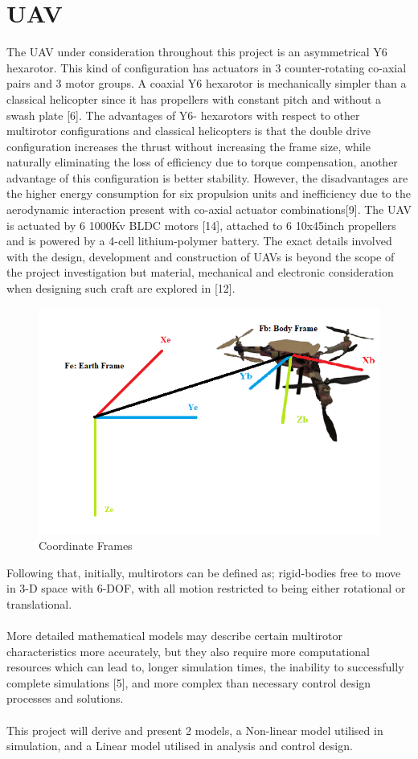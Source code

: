 \documentclass[12pt,a4paper,twoside]{report}
\begin{document}
		\section{UAV}
		
			The UAV under consideration throughout this project is an asymmetrical Y6 hexarotor. This kind of configuration has actuators in 3 counter-rotating co-axial pairs and 3 motor groups. A coaxial Y6 hexarotor is mechanically simpler than a classical helicopter since it has propellers with constant pitch and without a swash plate [6]. The advantages of Y6- hexarotors with respect to other multirotor configurations and classical helicopters is that the double drive configuration increases the thrust without increasing the frame size, while naturally eliminating the loss of efficiency due to torque compensation, another advantage of this configuration is better stability. However, the disadvantages are the higher energy consumption for six propulsion units and inefficiency due to the aerodynamic interaction present with co-axial actuator combinations[9]. The UAV is actuated by 6 1000Kv BLDC motors [14], attached to 6 10x45inch propellers and is powered by a 4-cell lithium-polymer battery. The exact details involved with the design, development and construction of UAVs is beyond the scope of the project investigation but material, mechanical and electronic consideration when designing such craft are explored in [12].
			
			\begin{figure}[h!]
				\centering
				\includegraphics[width=0.7\linewidth]{UAVwithFrames.png}
				\caption{Coordinate Frames}
				\label{fig:Coordinate frames}
			\end{figure} 
		
			Following that, initially, multirotors can be defined as; rigid-bodies free to move in 3-D space with 6-DOF, with all motion restricted to being either rotational or translational.
			\\ \\
			More detailed mathematical models may describe certain multirotor characteristics more accurately, but they also require more computational resources which can lead to, longer simulation times, the inability to successfully complete simulations [5], and more complex than necessary control design processes and solutions.
			\\ \\
			This project will derive and present 2 models, a Non-linear model utilised in simulation, and a Linear model utilised in analysis and control design.
			
\end{document}
